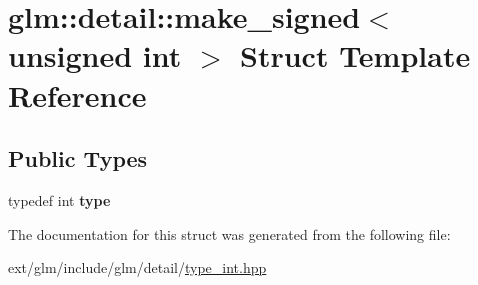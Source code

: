 \hypertarget{structglm_1_1detail_1_1make__signed_3_01unsigned_01int_01_4}{\section{glm\-:\-:detail\-:\-:make\-\_\-signed$<$ unsigned int $>$ Struct Template Reference}
\label{structglm_1_1detail_1_1make__signed_3_01unsigned_01int_01_4}
}
\subsection*{Public Types}
\begin{DoxyCompactItemize}
\item 
\hypertarget{structglm_1_1detail_1_1make__signed_3_01unsigned_01int_01_4_a78b4ada342bba40027f755d20eae141a}{typedef int {\bfseries type}}\label{structglm_1_1detail_1_1make__signed_3_01unsigned_01int_01_4_a78b4ada342bba40027f755d20eae141a}

\end{DoxyCompactItemize}


The documentation for this struct was generated from the following file\-:\begin{DoxyCompactItemize}
\item 
ext/glm/include/glm/detail/\hyperlink{type__int_8hpp}{type\-\_\-int.\-hpp}\end{DoxyCompactItemize}
